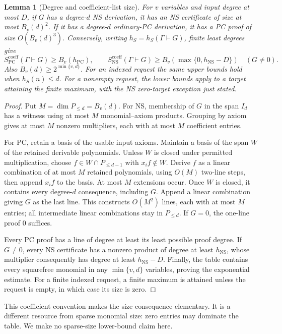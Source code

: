 \documentclass[11pt,a4paper]{article}
\newtheorem{lemma}[theorem]{Lemma}
\theoremstyle{definition}\newtheorem{definition}[theorem]{Definition}
\theoremstyle{remark}\newtheorem{remark}[theorem]{Remark}
\newcommand{\NS}{\mathrm{NS}}\newcommand{\PC}{\mathrm{PC}}
\begin{document}
\begin{lemma}[Degree and coefficient-list size]\label{lem:dense-size}
For $v$ variables and input degree at most $D$, if $G$ has a degree-$d$
NS derivation, it has an NS certificate of size at most $B_v(d)^2$.
If it has a degree-$d$ ordinary-PC derivation, it has a PC proof of
size $O(B_v(d)^3)$. Conversely,
writing $h_S=h_S(\Gamma\vdash G)$, finite least degrees give
\[
 S^{\mathrm{coeff}}_{\PC}(\Gamma\vdash G)\ge B_v(h_{\PC}),\qquad
 S^{\mathrm{coeff}}_{\NS}(\Gamma\vdash G)
                \ge B_v(\max\{0,h_{\NS}-D\})\quad(G\ne0).
\]
Also $B_v(d)\ge2^{\min\{v,d\}}$. For an indexed request the same upper
bounds hold when $h_S(n)\le d$. For a nonempty request, the lower
bounds apply to a target attaining the finite maximum, with the NS
zero-target exception just stated.
\end{lemma}
\begin{proof}
Put $M=\dim P_{\le d}=B_v(d)$. For NS, membership of $G$ in the span
$I_d$ has a witness using at most $M$ monomial--axiom products.
Grouping by axiom gives at most $M$ nonzero multipliers, each with at
most $M$ coefficient entries.

For PC, retain a basis of the usable input axioms. Maintain a basis of
the span $W$ of the retained derivable polynomials. Unless $W$ is
closed under permitted multiplication, choose
$f\in W\cap P_{\le d-1}$ with $x_if\notin W$. Derive $f$ as a linear
combination of at most $M$ retained polynomials, using $O(M)$ two-line
steps, then append $x_if$ to
the basis. At most $M$ extensions occur. Once $W$ is closed, it contains
every degree-$d$ consequence, including $G$. Append a linear
combination giving $G$ as the last line. This constructs $O(M^2)$
lines, each with at most $M$ entries; all intermediate linear
combinations stay in $P_{\le d}$. If $G=0$, the one-line proof $0$
suffices.

Every PC proof has a line of degree at least its least possible proof
degree. If $G\ne0$, every NS certificate has a nonzero product of
degree at least $h_{\NS}$, whose multiplier consequently has degree at
least $h_{\NS}-D$. Finally, the table contains every squarefree
monomial in any $\min\{v,d\}$ variables, proving the exponential
estimate. For a finite indexed request, a finite maximum is attained
unless the request is empty, in which case its size is zero.
\end{proof}

This coefficient convention makes the size consequence elementary.
It is a different resource from sparse monomial size: zero entries may
dominate the table. We make no sparse-size lower-bound claim here.
\end{document}
